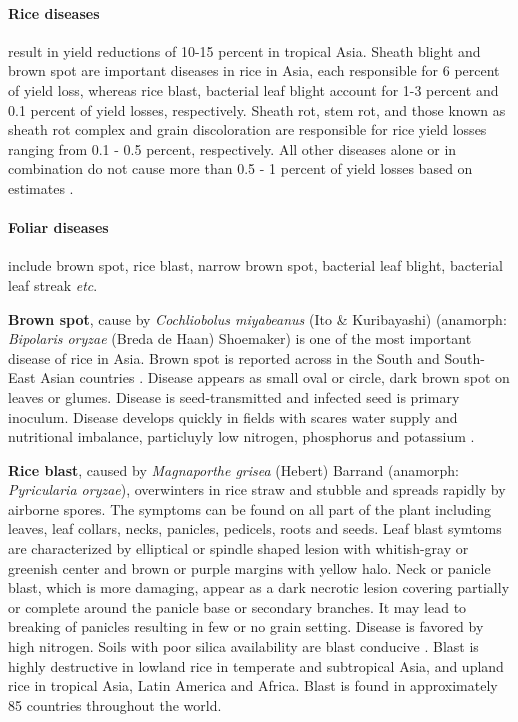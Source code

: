\documentclass[12pt, oneside]{report}
\begin{document}
\paragraph{Rice diseases} result in yield reductions of 10-15 percent in tropical Asia. Sheath blight and brown spot are important diseases in rice in Asia, each responsible for 6 percent of yield loss, whereas rice blast, bacterial leaf blight account for 1-3 percent and 0.1 percent of yield losses, respectively. Sheath rot, stem rot, and those known as sheath rot complex and grain discoloration are responsible for rice yield losses ranging from 0.1 - 0.5 percent, respectively. All other diseases alone or in combination do not cause more than 0.5 - 1 percent of yield losses based on estimates \citep{Savary:2000vr, mew2002handbook}.

\paragraph{Foliar diseases} include brown spot, rice blast, narrow brown spot, bacterial leaf blight, bacterial leaf streak \textit{etc}.

\textbf{Brown spot}, cause by \textit{Cochliobolus miyabeanus} (Ito \& Kuribayashi) (anamorph: \textit{Bipolaris oryzae} (Breda de Haan) Shoemaker) is one of the most important disease of rice in Asia. Brown spot is reported across in the South and South-East Asian countries \citep{barnwal2013review}. Disease appears as small oval or circle, dark brown spot on leaves or glumes. Disease is seed-transmitted and infected seed is primary inoculum. Disease develops quickly in fields with scares water supply and nutritional imbalance, particluyly low nitrogen, phosphorus and potassium \citep{irrirkb}. 

\textbf{Rice blast}, caused by \textit{Magnaporthe grisea} (Hebert) Barrand (anamorph: \textit{Pyricularia oryzae}), overwinters in rice straw and stubble and spreads rapidly by airborne spores. The symptoms can be found on all part of the plant including leaves, leaf collars, necks, panicles, pedicels, roots and seeds. Leaf blast symtoms are characterized by elliptical or spindle shaped lesion with whitish-gray or greenish center and brown or purple margins with yellow halo. Neck or panicle blast, which is more damaging, appear as a dark necrotic lesion covering partially or complete around the panicle base or secondary branches. It may lead to breaking of panicles resulting in few or no grain setting. Disease is favored by high nitrogen. Soils with poor silica availability are blast conducive \citep{irrirkb}. Blast is highly destructive in lowland rice in temperate and subtropical Asia, and upland rice in tropical Asia, Latin America and Africa. Blast is found in approximately 85 countries throughout the world.
\end{document}
